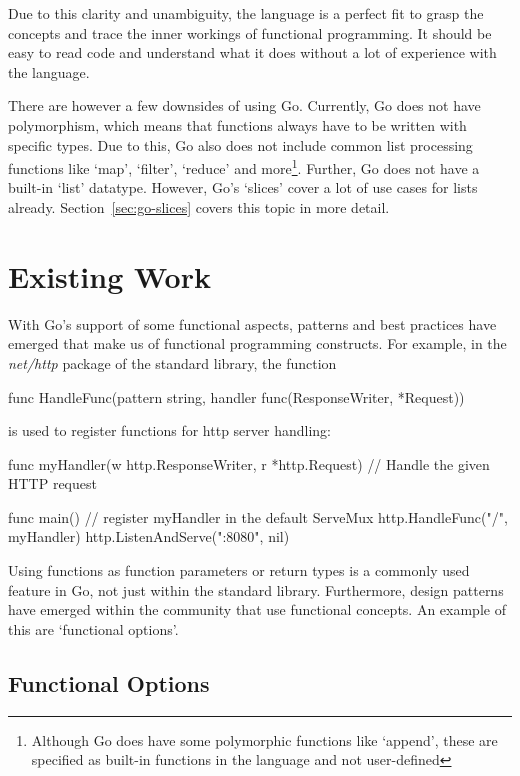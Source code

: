 Due to this clarity and unambiguity, the language is a perfect fit to grasp the concepts and trace
the inner workings of functional programming. It should be easy to read code and understand what
it does without a lot of experience with the language.

There are however a few downsides of using Go. Currently, Go does not have polymorphism, which means
that functions always have to be written with specific types. Due to this, Go also does not include
common list processing functions like `map', `filter', `reduce' and more\footnote{Although Go does
	have some polymorphic functions like `append', these are specified as built-in functions in the
language and not user-defined}. Further, Go does not have a built-in `list' datatype. However, Go's
`slices' cover a lot of use cases for lists already. Section~\ref{sec:go-slices} covers this topic
in more detail.

\section{Existing Work}

With Go's support of some functional aspects, patterns and best practices have emerged that make
us of functional programming constructs.
For example, in the \textit{net/http} package of the standard library, the function
\begin{gocode}
func HandleFunc(pattern string, handler func(ResponseWriter, *Request))
\end{gocode}
is used to register functions for http server handling\autocite{go-http-doc}:

\begin{gocode}
func myHandler(w http.ResponseWriter, r *http.Request) {
    // Handle the given HTTP request
}

func main() {
    // register myHandler in the default ServeMux
    http.HandleFunc("/", myHandler)
    http.ListenAndServe(":8080", nil)
}
\end{gocode}

Using functions as function parameters or return types is a commonly used feature in Go, not just
within the standard library. Furthermore, design patterns have emerged within the community
that use functional concepts. An example of this are `functional options'.

\subsection{Functional Options}

